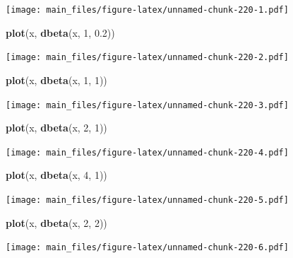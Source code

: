 \documentclass[]{book}
\newenvironment{Shaded}{\begin{snugshade}}{\end{snugshade}}
\newcommand{\KeywordTok}[1]{\textcolor[rgb]{0.13,0.29,0.53}{\textbf{#1}}}
\newcommand{\DecValTok}[1]{\textcolor[rgb]{0.00,0.00,0.81}{#1}}
\newcommand{\FloatTok}[1]{\textcolor[rgb]{0.00,0.00,0.81}{#1}}
\newcommand{\NormalTok}[1]{#1}
\begin{document}
\texttt{[image: main\_files/figure-latex/unnamed-chunk-220-1.pdf]}

\begin{Shaded}
\begin{Highlighting}[]
\KeywordTok{plot}\NormalTok{(x, }\KeywordTok{dbeta}\NormalTok{(x, }\DecValTok{1}\NormalTok{, }\FloatTok{0.2}\NormalTok{))}
\end{Highlighting}
\end{Shaded}

\texttt{[image: main\_files/figure-latex/unnamed-chunk-220-2.pdf]}

\begin{Shaded}
\begin{Highlighting}[]
\KeywordTok{plot}\NormalTok{(x, }\KeywordTok{dbeta}\NormalTok{(x, }\DecValTok{1}\NormalTok{, }\DecValTok{1}\NormalTok{))}
\end{Highlighting}
\end{Shaded}

\texttt{[image: main\_files/figure-latex/unnamed-chunk-220-3.pdf]}

\begin{Shaded}
\begin{Highlighting}[]
\KeywordTok{plot}\NormalTok{(x, }\KeywordTok{dbeta}\NormalTok{(x, }\DecValTok{2}\NormalTok{, }\DecValTok{1}\NormalTok{))}
\end{Highlighting}
\end{Shaded}

\texttt{[image: main\_files/figure-latex/unnamed-chunk-220-4.pdf]}

\begin{Shaded}
\begin{Highlighting}[]
\KeywordTok{plot}\NormalTok{(x, }\KeywordTok{dbeta}\NormalTok{(x, }\DecValTok{4}\NormalTok{, }\DecValTok{1}\NormalTok{))}
\end{Highlighting}
\end{Shaded}

\texttt{[image: main\_files/figure-latex/unnamed-chunk-220-5.pdf]}

\begin{Shaded}
\begin{Highlighting}[]
\KeywordTok{plot}\NormalTok{(x, }\KeywordTok{dbeta}\NormalTok{(x, }\DecValTok{2}\NormalTok{, }\DecValTok{2}\NormalTok{))}
\end{Highlighting}
\end{Shaded}

\texttt{[image: main\_files/figure-latex/unnamed-chunk-220-6.pdf]}
\end{document}
